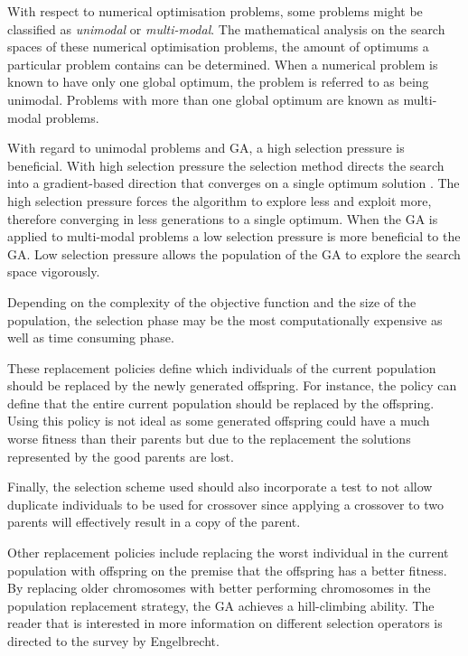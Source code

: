 With respect to numerical optimisation problems, some problems might be classified as \emph{unimodal} or \emph{multi-modal}\cite{FirstMathModel, CompuIntelligenceIntro}. The mathematical analysis on the search spaces of these numerical optimisation problems, the amount of optimums a particular problem contains can be determined\cite{FirstMathModel, CompuIntelligenceIntro}. When a numerical problem is known to have only one global optimum, the problem is referred to as being unimodal\cite{FirstMathModel, CompuIntelligenceIntro}. Problems with more than one global optimum are known as multi-modal problems\cite{FirstMathModel, CompuIntelligenceIntro}.

With regard to unimodal problems and \gls{GA}, a high selection pressure is beneficial\cite{ConstrainedGA}. With high selection pressure the selection method directs the search into a gradient-based direction that converges on a single optimum solution \cite{ConstrainedGA}. The high selection pressure forces the algorithm to explore less and exploit more, therefore converging in less generations to a single optimum. When the \gls{GA} is applied to multi-modal problems a low selection pressure is more beneficial to the \gls{GA}\cite{ConstrainedGA}. Low selection pressure allows the population of the \gls{GA} to explore the search space vigorously\cite{ConstrainedGA}.

Depending on the complexity of the objective function and the size of the population, the selection phase may be the most computationally expensive as well as time consuming phase\cite{AcceleratingGA}. 

These replacement policies define which individuals of the current population should be replaced by the newly generated offspring\cite{CompuIntelligenceIntro}. For instance, the policy can define that the entire current population should be replaced by the offspring\cite{CompuIntelligenceIntro}. Using this policy is not ideal as some generated offspring could have a much worse fitness than their parents but due to the replacement the solutions represented by the good parents are lost\cite{CompuIntelligenceIntro}. 

Finally, the selection scheme used should also incorporate a test to not allow duplicate individuals to be used for crossover since applying a crossover to two parents will effectively result in a copy of the parent\cite{CompuIntelligenceIntro}.

Other replacement policies include replacing the worst individual in the current population with offspring on the premise that the offspring has a better fitness\cite{CompuIntelligenceIntro}. By replacing older chromosomes with better performing chromosomes in the population replacement strategy, the \gls{GA} achieves a hill-climbing ability. The reader that is interested in more information on different selection operators is directed to the survey by Engelbrecht\cite{CompuIntelligenceIntro}.
